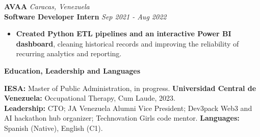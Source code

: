 \documentclass[10pt]{article}
\newcommand{\sectiontitle}[1]{%
    \vspace{3pt}
    \begin{center}
        \textbf{#1}
    \end{center}
    \vspace{-7pt}
}
\begin{document}
\vspace{2pt}
\textbf{AVAA} \hfill \textit{Caracas, Venezuela} \\
\textbf{Software Developer Intern} \hfill \textit{Sep 2021 - Aug 2022}
\begin{itemize}
    \item \textbf{Created Python ETL pipelines and an interactive Power BI dashboard}, cleaning historical records and improving the reliability of recurring analytics and reporting.
\end{itemize}

\sectiontitle{Education, Leadership and Languages}
\textbf{IESA:} Master of Public Administration, in progress. \textbf{Universidad Central de Venezuela:} Occupational Therapy, Cum Laude, 2023. \\
\textbf{Leadership:} CTO; JA Venezuela Alumni Vice President; Dev3pack Web3 and AI hackathon hub organizer; Technovation Girls code mentor. \textbf{Languages:} Spanish (Native), English (C1).
\end{document}

